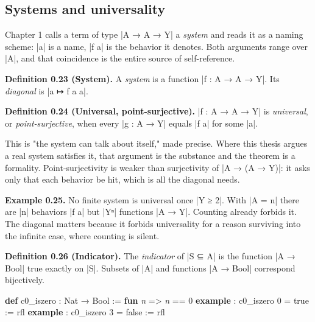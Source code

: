 \documentclass{memoir}
\begin{document}
\subsection{Systems and universality}\label{Two--Schemas--of--Impossibility-005F-005F-005F--Machine--Checked--Limits--of--Trustworthy--Machine--Learning-005F-005F-005F--and--Why--They--Tighten--with--Capability----Preliminaries----Sets--and--functions----Systems--and--universality}

Chapter 1 calls a term of type \LeanVerb|A → A → Y| a \emph{system} and reads it as a naming
scheme: \LeanVerb|a| is a name, \LeanVerb|f a| is the behavior it denotes. Both arguments range
over \LeanVerb|A|, and that coincidence is the entire source of self-reference.

\textbf{Definition 0.23 (System).} A \emph{system} is a function \LeanVerb|f : A → A → Y|. Its
\emph{diagonal} is \LeanVerb|a ↦ f a a|.

\textbf{Definition 0.24 (Universal, point-surjective).} \LeanVerb|f : A → A → Y| is \emph{universal},
or \emph{point-surjective}, when every \LeanVerb|g : A → Y| equals \LeanVerb|f a| for some \LeanVerb|a|.

This is "the system can talk about itself," made precise. Where this thesis
argues a real system satisfies it, that argument is the substance and the
theorem is a formality. Point-surjectivity is weaker than surjectivity of \LeanVerb|A → (A → Y)|:
it asks only that each behavior be hit, which is all the diagonal needs.

\textbf{Example 0.25.} No finite system is universal once \LeanVerb|Y ≥ 2|. With \LeanVerb|A = n|
there are \LeanVerb|n| behaviors \LeanVerb|f a| but \LeanVerb|Yⁿ| functions \LeanVerb|A → Y|. Counting already
forbids it. The diagonal matters because it forbids universality for a reason
surviving into the infinite case, where counting is silent.

\textbf{Definition 0.26 (Indicator).} The \emph{indicator} of \LeanVerb|S ⊆ A| is the function
\LeanVerb|A → Bool| true exactly on \LeanVerb|S|. Subsets of \LeanVerb|A| and functions \LeanVerb|A → Bool|
correspond bijectively.

\begin{LeanVerbatim}
\textbf{def} c0_iszero : Nat → Bool := \textbf{fun} \textit{n} => \textit{n} == 0
\textbf{example} : c0_iszero 0 = true := rfl
\textbf{example} : c0_iszero 3 = false := rfl

\end{LeanVerbatim}
\end{document}
